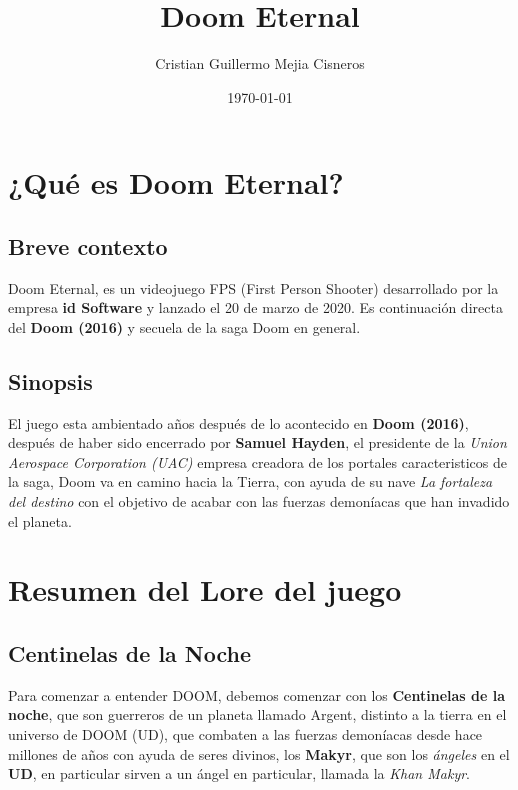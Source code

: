 \documentclass[spanish,12pt,letterpaper]{article}
\title{Doom Eternal}
\author{Cristian Guillermo Mejia Cisneros}
\date{\today}
\begin{document}
	\maketitle
	\newpage
	
	
	
	\section{¿Qué es Doom Eternal?}

    \subsection{Breve contexto}

   \noindent Doom Eternal, es un videojuego FPS (First Person Shooter) desarrollado por la empresa \textbf{id Software} y lanzado el 20 de marzo de 2020. Es continuación directa del \textbf{Doom (2016)} y secuela de la saga Doom en general.

    \subsection{Sinopsis}
    
	\noindent El juego esta ambientado años después de lo acontecido en \textbf{Doom (2016)}, después de haber sido encerrado por \textbf{Samuel Hayden}, el presidente de la \textit{Union Aerospace Corporation (UAC)} empresa creadora de los portales caracteristicos de la saga, Doom va en camino hacia la Tierra, con ayuda de su nave \textit{La fortaleza del destino} con el objetivo de acabar con las fuerzas demoníacas que han invadido el planeta. \\[1mm]


\section{Resumen del Lore del juego}

\subsection{Centinelas de la Noche}

\noindent Para comenzar a entender DOOM, debemos comenzar con los \textbf{Centinelas de la noche}, que son guerreros de un planeta llamado Argent, distinto a la tierra en el universo de DOOM (UD), que combaten a las fuerzas demoníacas desde hace millones de años con ayuda de seres divinos, los \textbf{Makyr}, que son los \textit{ángeles} en el \textbf{UD}, en particular sirven a un ángel en particular, llamada la \textit{Khan Makyr}.
\end{document}
